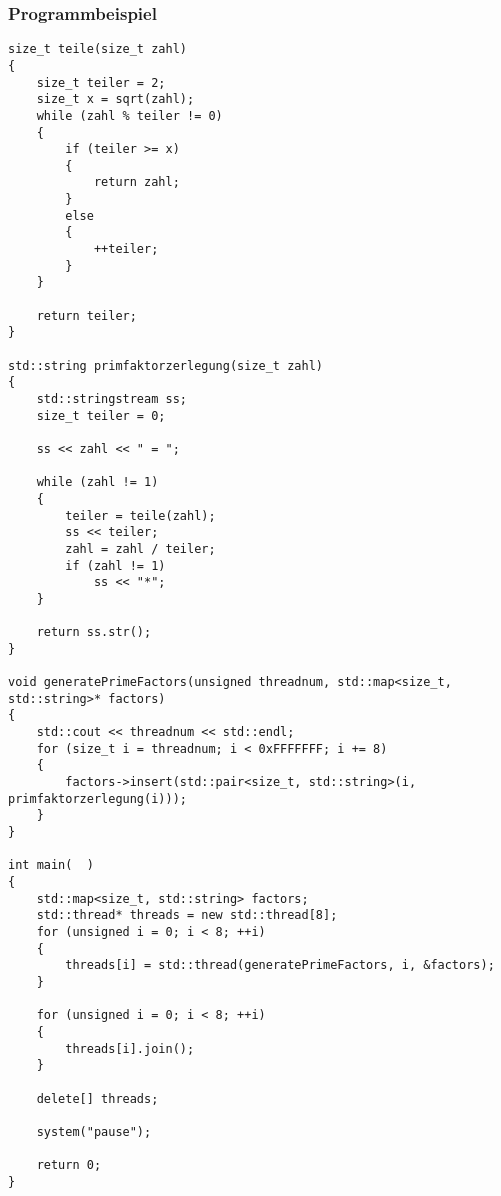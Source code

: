 \subsubsection{Programmbeispiel}
\begin{lstlisting}
size_t teile(size_t zahl)
{
	size_t teiler = 2;
	size_t x = sqrt(zahl);
	while (zahl % teiler != 0)
	{
		if (teiler >= x)
		{
			return zahl;
		}
		else
		{
			++teiler;
		}
	}

	return teiler;
}

std::string primfaktorzerlegung(size_t zahl)
{
	std::stringstream ss;
	size_t teiler = 0;

	ss << zahl << " = ";

	while (zahl != 1)
	{
		teiler = teile(zahl);
		ss << teiler;
		zahl = zahl / teiler;
		if (zahl != 1)
			ss << "*";
	}

	return ss.str();
}

void generatePrimeFactors(unsigned threadnum, std::map<size_t, std::string>* factors)
{
	std::cout << threadnum << std::endl;
	for (size_t i = threadnum; i < 0xFFFFFFF; i += 8)
	{
		factors->insert(std::pair<size_t, std::string>(i, primfaktorzerlegung(i)));
	}
}

int main(  )
{
	std::map<size_t, std::string> factors;
	std::thread* threads = new std::thread[8];
	for (unsigned i = 0; i < 8; ++i)
	{
		threads[i] = std::thread(generatePrimeFactors, i, &factors);
	}

	for (unsigned i = 0; i < 8; ++i)
	{
		threads[i].join();
	}

	delete[] threads;

	system("pause");

    return 0;
}
\end{lstlisting}